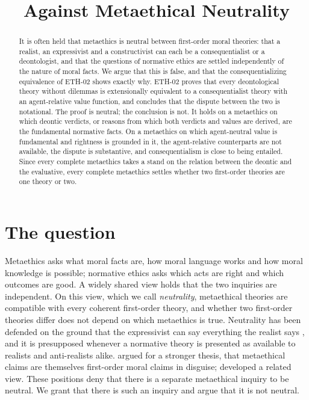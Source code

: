 \documentclass{situationist-preprint}
\title{Against Metaethical Neutrality}
\begin{document}
\maketitle

\begin{abstract}
It is often held that metaethics is neutral between first-order moral theories: that a realist, an expressivist and a constructivist can each be a consequentialist or a deontologist, and that the questions of normative ethics are settled independently of the nature of moral facts. We argue that this is false, and that the consequentializing equivalence of ETH-02 shows exactly why. ETH-02 proves that every deontological theory without dilemmas is extensionally equivalent to a consequentialist theory with an agent-relative value function, and concludes that the dispute between the two is notational. The proof is neutral; the conclusion is not. It holds on a metaethics on which deontic verdicts, or reasons from which both verdicts and values are derived, are the fundamental normative facts. On a metaethics on which agent-neutral value is fundamental and rightness is grounded in it, the agent-relative counterparts are not available, the dispute is substantive, and consequentialism is close to being entailed. Since every complete metaethics takes a stand on the relation between the deontic and the evaluative, every complete metaethics settles whether two first-order theories are one theory or two.
\end{abstract}

\section{The question}

Metaethics asks what moral facts are, how moral language works and how moral knowledge is possible; normative ethics asks which acts are right and which outcomes are good. A widely shared view holds that the two inquiries are independent. On this view, which we call \emph{neutrality}, metaethical theories are compatible with every coherent first-order theory, and whether two first-order theories differ does not depend on which metaethics is true. Neutrality has been defended on the ground that the expressivist can say everything the realist says \citep{Blackburn1993}, and it is presupposed whenever a normative theory is presented as available to realists and anti-realists alike. \citet{Dworkin1996} argued for a stronger thesis, that metaethical claims are themselves first-order moral claims in disguise; \citet{Kramer2009} developed a related view. These positions deny that there is a separate metaethical inquiry to be neutral. We grant that there is such an inquiry and argue that it is not neutral.
\end{document}
